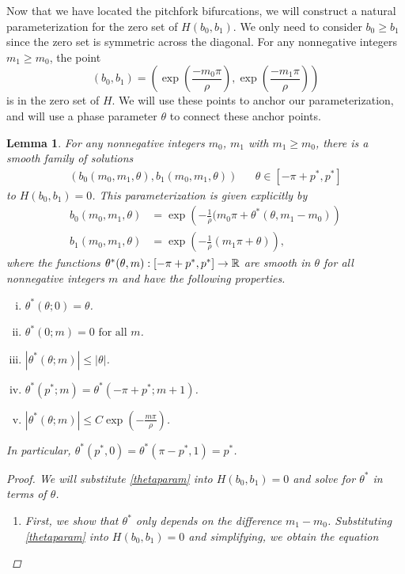 \documentclass[12pt]{elsarticle}
\theoremstyle{plain}
\newtheorem{lemma}[theorem]{Lemma}
\theoremstyle{definition}
\theoremstyle{remark}
\numberwithin{theorem}{section}
\numberwithin{equation}{section}
\begin{document}
Now that we have located the pitchfork bifurcations, we will construct a natural parameterization for the zero set of $H(b_0, b_1)$. We only need to consider $b_0 \geq b_1$ since the zero set is symmetric across the diagonal. For any nonnegative integers $m_1 \geq m_0$, the point
\[
(b_0, b_1) = \left( \exp\left( \frac{-m_0 \pi}{\rho} \right), \exp \left( \frac{-m_1 \pi}{\rho} \right) \right)
\]
is in the zero set of $H$. We will use these points to anchor our parameterization, and will use a phase parameter $\theta$ to connect these anchor points. 

\begin{lemma}\label{thetaparamlemma}
For any nonnegative integers $m_0$, $m_1$ with $m_1 \geq m_0$, there is a smooth family of solutions
\begin{align*}
\left( b_0( m_0, m_1, \theta), b_1( m_0, m_1, \theta) \right) && \theta \in [-\pi + p^*, p^*]
\end{align*}
to $H(b_0, b_1) = 0$. This parameterization is given explicitly by
\begin{equation}\label{thetaparam}
\begin{aligned}
b_0( m_0, m_1, \theta) &= \exp\left( -\frac{1}{\rho}(m_0 \pi + \theta^*(\theta, m_1 - m_0) \right) \\
b_1( m_0, m_1, \theta) &= \exp\left( -\frac{1}{\rho}(m_1 \pi + \theta) \right),
\end{aligned}
\end{equation}
where the functions $\theta^*(\theta, m) : [-\pi + p^*, p^*] \rightarrow \mathbb{R}$ are smooth in $\theta$ for all nonnegative integers $m$ and have the following properties.
\begin{enumerate}[(i)]
\item $\theta^*(\theta; 0) = \theta$.
\item $\theta^*(0; m) = 0 \text{ for all } m$.
\item $|\theta^*(\theta; m)| \leq |\theta|$.
\item $\theta^*(p^*; m) = \theta^*(-\pi+p^*; m+1)$.
\item $|\theta^*(\theta; m)| \leq C \exp\left(-\frac{m \pi}{\rho} \right)$.
\end{enumerate}
In particular, $\theta^*(p^*, 0) = \theta^*(\pi - p^*, 1) = p^*$.
\begin{proof}
We will substitute \cref{thetaparam} into $H(b_0, b_1) = 0$ and solve for $\theta^*$ in terms of $\theta$.
\begin{enumerate}
\item First, we show that $\theta^*$ only depends on the difference $m_1 - m_0$. Substituting \cref{thetaparam} into $H(b_0, b_1) = 0$ and simplifying, we obtain the equation

\end{enumerate}
\end{proof}
\end{lemma}
\end{document}

